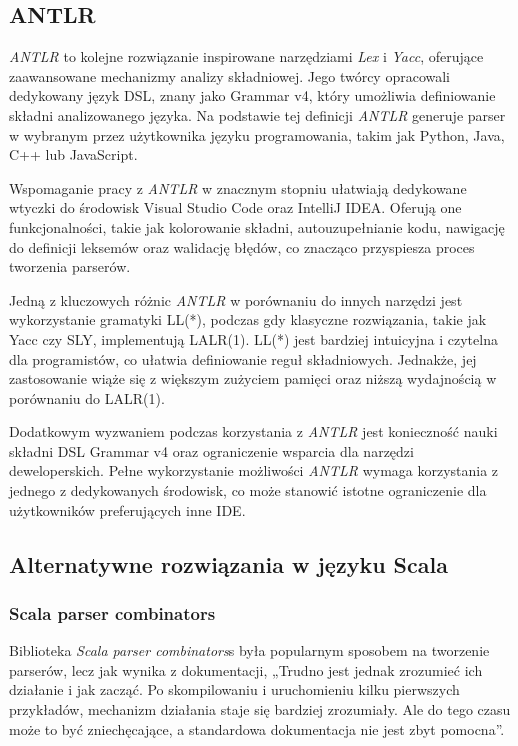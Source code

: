 \subsection{ANTLR}
\label{subsec:antlr}

\textit{ANTLR} to kolejne rozwiązanie inspirowane narzędziami \textit{Lex} i \textit{Yacc}, oferujące zaawansowane mechanizmy analizy składniowej.
Jego twórcy opracowali dedykowany język DSL, znany jako Grammar v4, który umożliwia definiowanie składni analizowanego języka.
Na podstawie tej definicji \textit{ANTLR} generuje parser w wybranym przez użytkownika języku programowania, takim jak Python, Java, C++ lub JavaScript.

Wspomaganie pracy z \textit{ANTLR} w znacznym stopniu ułatwiają dedykowane wtyczki do środowisk Visual Studio Code oraz IntelliJ IDEA. Oferują one funkcjonalności, takie jak kolorowanie składni, autouzupełnianie kodu, nawigację do definicji leksemów oraz walidację błędów, co znacząco przyspiesza proces tworzenia parserów.

Jedną z kluczowych różnic \textit{ANTLR} w porównaniu do innych narzędzi jest wykorzystanie gramatyki LL(*), podczas gdy klasyczne rozwiązania, takie jak Yacc czy SLY, implementują LALR(1).
LL(*) jest bardziej intuicyjna i czytelna dla programistów, co ułatwia definiowanie reguł składniowych.
Jednakże, jej zastosowanie wiąże się z większym zużyciem pamięci oraz niższą wydajnością w porównaniu do LALR(1).

Dodatkowym wyzwaniem podczas korzystania z \textit{ANTLR} jest konieczność nauki składni DSL Grammar v4 oraz ograniczenie wsparcia dla narzędzi deweloperskich.
Pełne wykorzystanie możliwości \textit{ANTLR} wymaga korzystania z jednego z dedykowanych środowisk, co może stanowić istotne ograniczenie dla użytkowników preferujących inne IDE\@.

\subsection{Alternatywne rozwiązania w języku Scala}
\label{subsec:rozwiazania-w-jezyku-scal}

\subsubsection{Scala parser combinators}
\label{subsubsec:scala-parser-combinators}

Biblioteka \textit{Scala parser combinators}s\cite{moors2008parser} była popularnym sposobem na tworzenie parserów, lecz jak wynika z dokumentacji, „Trudno jest jednak zrozumieć ich działanie i jak zacząć. Po skompilowaniu i uruchomieniu kilku pierwszych przykładów, mechanizm działania staje się bardziej zrozumiały. Ale do tego czasu może to być zniechęcające, a standardowa dokumentacja nie jest zbyt pomocna”\cite{parser-combinators-readme}.

